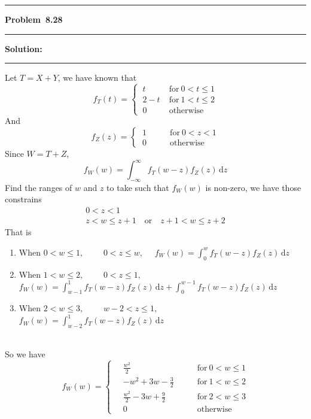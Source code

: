 \documentclass[10.5pt]{article}
\newcommand\question[1]{\vspace{.2in}\hrule\vspace{0.04in}\textbf{Problem\ #1}\vspace{.4em}\hrule\vspace{.10in}}
\newcommand\Solution{\vspace{.3in}\textbf{Solution:}\vspace{.5em}\hrule\vspace{.08in}\par}
\begin{document}
\pagebreak
\question{8.28}
\Solution{}Let $T = X+Y$, 
we have known that \begin{equation*}
	f_T(t)=\begin{cases}
		\ t\qquad &\text{for}\ 0<t\leqslant 1\\[6pt]
		\ 2-t &\text{for}\ 1<t\leqslant 2\\[6pt]
		\ 0 &\text{otherwise}
	\end{cases}
\end{equation*}
And \begin{equation*}
	f_Z(z)=\begin{cases}
		\ 1\qquad &\text{for}\ 0<z< 1\\[6pt]
		\ 0 &\text{otherwise}
	\end{cases}
\end{equation*}
Since $W = T + Z$, $$f_W(w) = \int_{-\infty}^{\infty}f_T(w-z)f_Z(z)\,\mathrm{d}z$$
Find the ranges of $w$ and $z$ to take such that $f_W(w)$ is non-zero, we have those constrains
\begin{gather*}
	0<z<1\\[6pt]
	z<w\leqslant z+1 \quad \text{or}\quad  z+1<w\leqslant z+2
\end{gather*}
That is \begin{enumerate}[1.]
	\item When $0<w\leqslant 1,\qquad$ $0<z\leqslant w,\quad$ $\displaystyle{f_W(w)=\int_{0}^{w}f_T(w-z)f_Z(z)\,\mathrm{d}z}$
	\item When $1<w\leqslant 2,\qquad$ $0<z\leqslant 1,\quad$ $\displaystyle{f_W(w)=\int_{w-1}^{1}f_T(w-z)f_Z(z)\,\mathrm{d}z + \int_{0}^{w-1}f_T(w-z)f_Z(z)\,\mathrm{d}z}$
	\item When $2<w\leqslant 3,\qquad$ $w-2<z\leqslant 1,\quad$ $\displaystyle{f_W(w)=\int_{w-2}^{1}f_T(w-z)f_Z(z)\,\mathrm{d}z}$
\end{enumerate}
\ \\
So we have  
$$	f_W(w)=\begin{cases}
	\quad \displaystyle{\frac{w^2}{2}}	 &\text{for}\ 0<w\leqslant 1\\[12pt]
		
	\quad \displaystyle{-w^2 + 3w -\frac{3}{2}}\qquad	&\text{for}\ 1<w\leqslant 2\\[12pt]

	\quad \displaystyle{\frac{w^2}{2} - 3w +\frac{9}{2}}	&\text{for}\ 2<w\leqslant 3\\[12pt]
		
	\quad0	&\text{otherwise}
	\end{cases}$$
\end{document}
